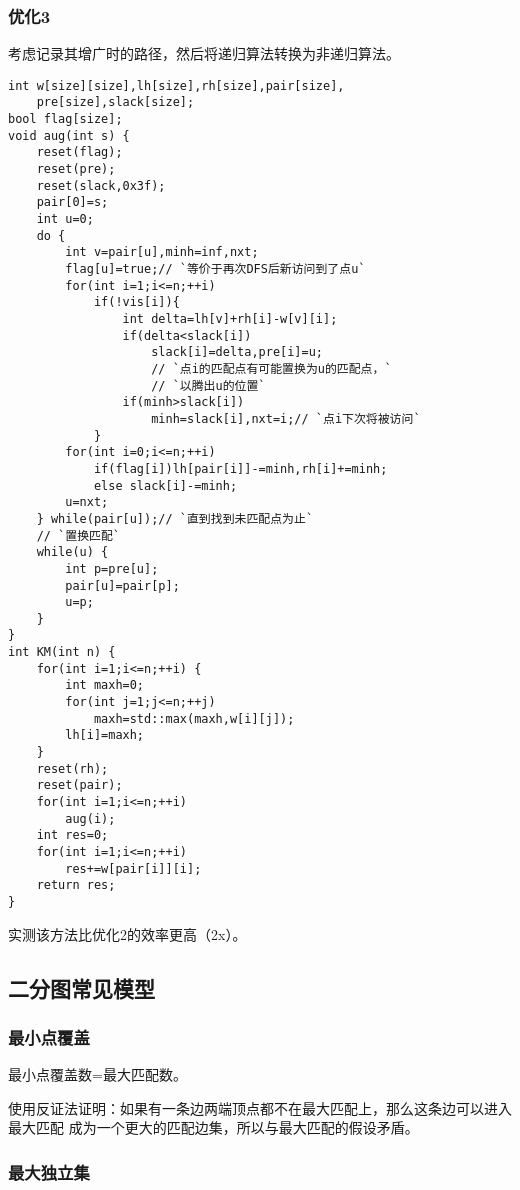 \subsubsection{优化3}
考虑记录其增广时的路径，然后将递归算法转换为非递归算法。
\begin{lstlisting}
int w[size][size],lh[size],rh[size],pair[size],
    pre[size],slack[size];
bool flag[size];
void aug(int s) {
    reset(flag);
    reset(pre);
    reset(slack,0x3f);
    pair[0]=s;
    int u=0;
    do {
        int v=pair[u],minh=inf,nxt;
        flag[u]=true;// `等价于再次DFS后新访问到了点u`
        for(int i=1;i<=n;++i)
            if(!vis[i]){
                int delta=lh[v]+rh[i]-w[v][i];
                if(delta<slack[i])
                    slack[i]=delta,pre[i]=u;
                    // `点i的匹配点有可能置换为u的匹配点，`
                    // `以腾出u的位置`
                if(minh>slack[i])
                    minh=slack[i],nxt=i;// `点i下次将被访问`
            }
        for(int i=0;i<=n;++i)
            if(flag[i])lh[pair[i]]-=minh,rh[i]+=minh;
            else slack[i]-=minh;
        u=nxt;
    } while(pair[u]);// `直到找到未匹配点为止`
    // `置换匹配`
    while(u) {
        int p=pre[u];
        pair[u]=pair[p];
        u=p;
    }
}
int KM(int n) {
    for(int i=1;i<=n;++i) {
        int maxh=0;
        for(int j=1;j<=n;++j)
            maxh=std::max(maxh,w[i][j]);
        lh[i]=maxh;
    }
    reset(rh);
    reset(pair);
    for(int i=1;i<=n;++i)
        aug(i);
    int res=0;
    for(int i=1;i<=n;++i)
        res+=w[pair[i]][i];
    return res;
}
\end{lstlisting}
实测该方法比优化2的效率更高（2x）。
\subsection{二分图常见模型}
\subsubsection{最小点覆盖}
\begin{theorem}
	最小点覆盖数=最大匹配数。
\end{theorem}

使用反证法证明：如果有一条边两端顶点都不在最大匹配上，那么这条边可以进入最大匹配
成为一个更大的匹配边集，所以与最大匹配的假设矛盾。

\subsubsection{最大独立集}

